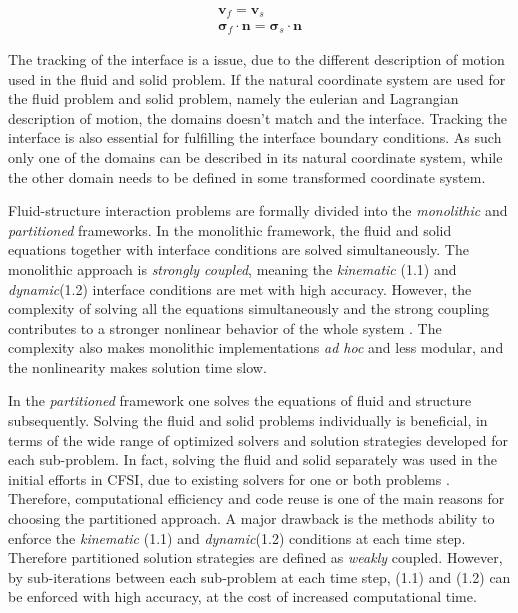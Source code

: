 \begin{align}
\mathbf{v}_f = \mathbf{v}_s \\
\mathbf{\sigma}_f \cdot \mathbf{n} = \mathbf{\sigma}_s \cdot \mathbf{n}
\label{sec:intcond}
\end{align}


The tracking of the interface is a issue, due to the different description of motion used in the fluid and solid problem. If the natural coordinate system are used for the fluid problem and solid problem, namely the eulerian and Lagrangian description of motion, the domains doesn't match and the interface. Tracking the interface is also essential for fulfilling the interface boundary conditions. As such only one of the domains can be described in its natural coordinate system, while the other domain needs to be defined in some transformed coordinate system.    

Fluid-structure interaction problems are formally divided into the \textit{monolithic} and \textit{partitioned} frameworks.  In the monolithic framework, the fluid and solid equations together with interface conditions are solved simultaneously. The monolithic approach is  \textit{strongly coupled}, meaning the \textit{kinematic} (1.1) and \textit{dynamic}(1.2) interface conditions are met with high accuracy. However, the complexity of solving all the equations simultaneously and the strong coupling contributes to a stronger nonlinear behavior of the whole system \cite{Wick}. The complexity also makes monolithic implementations \textit{ad hoc} and less modular, and the nonlinearity makes solution time slow.

In the \textit{partitioned} framework one solves the equations of fluid and structure subsequently. Solving the fluid and solid problems individually is beneficial, in terms of the wide range of optimized solvers and solution strategies developed for each sub-problem. In fact, solving the fluid and solid separately was used in the initial efforts in CFSI, due to existing solvers for one or both problems \cite{Gatzhammer2014}. Therefore, computational efficiency and code reuse is one of the main reasons for choosing the partitioned approach. A major drawback is the methods ability to enforce the \textit{kinematic} (1.1) and \textit{dynamic}(1.2) conditions at each time step. Therefore partitioned solution strategies are defined as  \textit{weakly} coupled. However, by sub-iterations between each sub-problem at each time step, (1.1) and (1.2) can be enforced with high accuracy, at the cost of increased computational time.  \\

